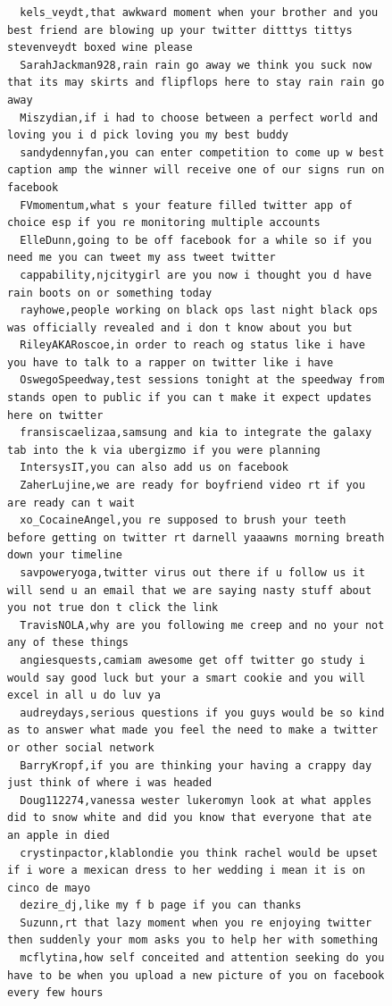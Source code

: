 \begin{figure}[htpb]
\begin{verbatim}
  kels_veydt,that awkward moment when your brother and you best friend are blowing up your twitter ditttys tittys stevenveydt boxed wine please
  SarahJackman928,rain rain go away we think you suck now that its may skirts and flipflops here to stay rain rain go away
  Miszydian,if i had to choose between a perfect world and loving you i d pick loving you my best buddy
  sandydennyfan,you can enter competition to come up w best caption amp the winner will receive one of our signs run on facebook
  FVmomentum,what s your feature filled twitter app of choice esp if you re monitoring multiple accounts
  ElleDunn,going to be off facebook for a while so if you need me you can tweet my ass tweet twitter
  cappability,njcitygirl are you now i thought you d have rain boots on or something today
  rayhowe,people working on black ops last night black ops was officially revealed and i don t know about you but
  RileyAKARoscoe,in order to reach og status like i have you have to talk to a rapper on twitter like i have
  OswegoSpeedway,test sessions tonight at the speedway from stands open to public if you can t make it expect updates here on twitter
  fransiscaelizaa,samsung and kia to integrate the galaxy tab into the k via ubergizmo if you were planning
  IntersysIT,you can also add us on facebook
  ZaherLujine,we are ready for boyfriend video rt if you are ready can t wait
  xo_CocaineAngel,you re supposed to brush your teeth before getting on twitter rt darnell yaaawns morning breath down your timeline
  savpoweryoga,twitter virus out there if u follow us it will send u an email that we are saying nasty stuff about you not true don t click the link
  TravisNOLA,why are you following me creep and no your not any of these things
  angiesquests,camiam awesome get off twitter go study i would say good luck but your a smart cookie and you will excel in all u do luv ya
  audreydays,serious questions if you guys would be so kind as to answer what made you feel the need to make a twitter or other social network
  BarryKropf,if you are thinking your having a crappy day just think of where i was headed
  Doug112274,vanessa wester lukeromyn look at what apples did to snow white and did you know that everyone that ate an apple in died
  crystinpactor,klablondie you think rachel would be upset if i wore a mexican dress to her wedding i mean it is on cinco de mayo
  dezire_dj,like my f b page if you can thanks
  Suzunn,rt that lazy moment when you re enjoying twitter then suddenly your mom asks you to help her with something
  mcflytina,how self conceited and attention seeking do you have to be when you upload a new picture of you on facebook every few hours

\end{verbatim}
\end{figure}
